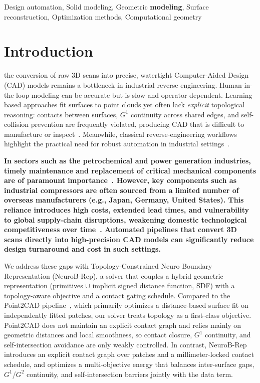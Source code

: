 \documentclass{ieeeaccess}
\providecommand{\DIFaddtex}[1]{{\color{blue}\bfseries #1}} %
\providecommand{\DIFaddbegin}{} %
\providecommand{\DIFaddend}{} %
\providecommand{\DIFadd}[1]{\texorpdfstring{\DIFaddtex{#1}}{#1}} %
\begin{document}
\begin{keywords}
Design automation, Solid modeling, Geometric \DIFaddbegin \DIFadd{modeling}\DIFaddend , Surface reconstruction, Optimization methods, Computational geometry
\end{keywords}


\titlepgskip=-15pt
\maketitle

\section{Introduction}
\label{sec:introduction}
 the conversion of raw 3D scans into precise, watertight Computer-Aided Design (CAD) models remains a bottleneck in industrial reverse engineering. Human-in-the-loop modeling can be accurate but is slow and operator dependent. Learning-based approaches fit surfaces to point clouds yet often lack \emph{explicit} topological reasoning: contacts between surfaces, $G^1$ continuity across shared edges, and self-collision prevention are frequently violated, producing CAD that is difficult to manufacture or inspect~\cite{b2,b3,b4,b20,b1,b9,b24}. Meanwhile, classical reverse-engineering workflows highlight the practical need for robust automation in industrial settings~\cite{b16,b25}.

\DIFaddbegin \DIFadd{In sectors such as the petrochemical and power generation industries, timely maintenance and replacement of critical mechanical components are of paramount importance~\cite{b16,b25}. However, key components such as industrial compressors are often sourced from a limited number of overseas manufacturers (e.g., Japan, Germany, United States). This reliance introduces high costs, extended lead times, and vulnerability to global supply-chain disruptions, weakening domestic technological competitiveness over time~\cite{b16}. Automated pipelines that convert 3D scans directly into high-precision CAD models can significantly reduce design turnaround and cost in such settings.
}

\DIFaddend We address these gaps with Topology-Constrained Neuro Boundary Representation (NeuroB-Rep), a solver that couples a hybrid geometric representation (primitives $\cup$ implicit signed distance function, SDF) with a topology-aware objective and a contact gating schedule.
Compared to the Point2CAD pipeline~\cite{b2}, which primarily optimizes a distance-based surface fit on independently fitted patches, our solver treats topology as a first-class objective. Point2CAD does not maintain an explicit contact graph and relies mainly on geometric distances and local smoothness, so contact closure, $G^1$ continuity, and self-intersection avoidance are only weakly controlled. In contrast, NeuroB-Rep introduces an explicit contact graph over patches and a millimeter-locked contact schedule, and optimizes a multi-objective energy that balances inter-surface gaps, $G^1$/$G^2$ continuity, and self-intersection barriers jointly with the data term.
\end{document}

